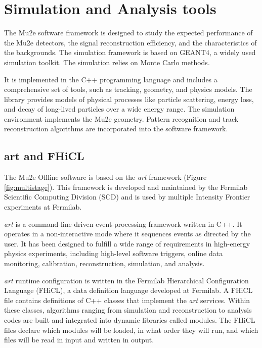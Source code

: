 
\chapter{Simulation and Analysis tools}\label{mu2eana}

The Mu2e software framework is designed to study the expected performance of the Mu2e detectors, the signal 
reconstruction efficiency, and the characteristics of the backgrounds. The simulation framework is based on 
GEANT4, a widely used simulation toolkit. The simulation relies on Monte Carlo methods.

It is implemented in the C++ programming language and includes a comprehensive set of tools, such as 
tracking, geometry, and physics models. The library provides models of physical processes like particle 
scattering, energy loss, and decay of long-lived particles over a wide energy range. The simulation 
environment implements the Mu2e geometry. Pattern recognition and track reconstruction algorithms are 
incorporated into the software framework.

\section{art and FHiCL}

The Mu2e Offline software is based on the \textit{art} framework (Figure \ref{fig:multistage}). 
This framework is developed and maintained by the Fermilab Scientific 
Computing Division (SCD) and is used by multiple Intensity Frontier experiments at Fermilab.


\textit{art} is a command-line-driven event-processing framework written in 
C++. It operates in a non-interactive mode where it sequences events as directed 
by the user. It has been designed to fulfill a wide range of requirements in 
high-energy physics experiments, including high-level software triggers, online data 
monitoring, calibration, reconstruction, simulation, and analysis.


\textit{art} runtime configuration is written in the Fermilab Hierarchical 
Configuration Language (FHiCL), a data definition language developed at Fermilab. 
A FHiCL file contains definitions of C++ classes that implement the \textit{art} 
services. Within these classes, algorithms ranging from simulation and 
reconstruction to analysis codes are built and integrated into dynamic 
libraries called modules. The FHiCL files declare which modules will be loaded, 
in what order they will run, and which files will be read in input and written in output.



